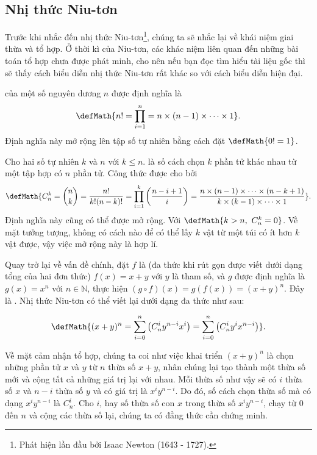 \subsection{Nhị thức Niu-tơn}

Trước khi nhắc đến nhị thức Niu-tơn\footnote{Phát hiện lần đầu bởi Isaac Newton (1643 - 1727).}, chúng ta sẽ nhắc lại về khái niệm giai thừa và tổ hợp. Ở thời kì của Niu-tơn, các khác niệm liên quan đến những bài toán tổ hợp chưa được phát minh, cho nên nếu bạn đọc tìm hiểu tài liệu gốc thì sẽ thấy cách biểu diễn nhị thức Niu-tơn rất khác so với cách biểu diễn hiện đại.

 của một số nguyên dương $n$ được định nghĩa là
$$\defMath{n!= \prod_{i = 1}^{n} = n\times(n-1)\times \cdots \times 1}.$$
Định nghĩa này mở rộng lên tập số tự nhiên bằng cách đặt $\defMath{0!=1}$.

Cho hai số tự nhiên $k$ và $n$ với $k \leq n$.  là số cách chọn $k$ phần tử khác nhau từ một tập hợp có $n$ phần tử. Công thức được cho bởi
$$\defMath{C_n^k = \binom{n}{k} = \frac{n!}{k!(n - k)!} = \prod_{i=1}^{k}\left(\frac{n - i + 1}{i}\right) = \frac{n\times(n-1)\times \cdots \times (n-k+1)}{k\times (k-1)\times \cdots \times 1}}.$$
Định nghĩa này cũng có thể được mở rộng. Với $\defMath{k > n,~C_n^k = 0}$. Về mặt tưởng tượng, không có cách nào để có thể lấy $k$ vật từ một túi có ít hơn $k$ vật được, vậy việc mở rộng này là hợp lí.

Quay trở lại về vấn đề chính, đặt $f$ là  (đa thức khi rút gọn được viết dưới dạng tổng của hai đơn thức) $f(x) = x + y$ với $y$ là tham số, và $g$ được định nghĩa là $g(x) = x^n$ với $n \in \mathbb{N}$, thực hiện $\left(g \circ f\right)(x) = g(f(x)) = (x + y)^n$. Đây là . Nhị thức Niu-tơn có thể viết lại dưới dạng đa thức như sau:

$$\defMath{(x + y)^n = \sum_{i = 0}^{n} \left(C_n^i y^{n-i} x^i \right) = \sum_{i = 0}^{n}\left( C_n^i y^i x^{n-i} \right)}.$$

Về mặt cảm nhận tổ hợp, chúng ta coi như việc khai triển $(x + y)^n$ là chọn những phần tử $x$ và $y$ từ $n$ thừa số $x + y$, nhân chúng lại tạo thành một thừa số mới và cộng tất cả những giá trị lại với nhau. Mỗi thừa số như vậy sẽ có $i$ thừa số $x$ và $n-i$ thừa số $y$ và có giá trị là $x^iy^{n-i}$. Do đó, số cách chọn thừa số mà có dạng $x^iy^{n-i}$ là $C_n^i$. Cho $i$, hay số thừa số con $x$ trong thừa số $x^iy^{n-i}$, chạy từ $0$ đến $n$ và cộng các thừa số lại, chúng ta có đẳng thức cần chứng minh.


